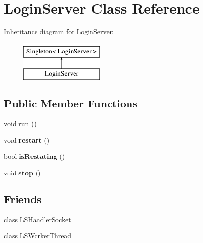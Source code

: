 \hypertarget{classLoginServer}{
\section{LoginServer Class Reference}
\label{classLoginServer}
}
Inheritance diagram for LoginServer:\begin{figure}[H]
\begin{center}
\leavevmode
\includegraphics[height=2.000000cm]{classLoginServer}
\end{center}
\end{figure}
\subsection*{Public Member Functions}
\begin{DoxyCompactItemize}
\item 
void \hyperlink{classLoginServer_a29e3fd0f5ebca8308d13c87e90587bf0}{run} ()
\item 
\hypertarget{classLoginServer_a7481a515c2e42aa94305651a77cc74f2}{
void {\bfseries restart} ()}
\label{classLoginServer_a7481a515c2e42aa94305651a77cc74f2}

\item 
\hypertarget{classLoginServer_ad3f8af7a2f8d63c41d7cc254052ce88d}{
bool {\bfseries isRestating} ()}
\label{classLoginServer_ad3f8af7a2f8d63c41d7cc254052ce88d}

\item 
\hypertarget{classLoginServer_a132ed40114e80995150ad7eb115d281a}{
void {\bfseries stop} ()}
\label{classLoginServer_a132ed40114e80995150ad7eb115d281a}

\end{DoxyCompactItemize}
\subsection*{Friends}
\begin{DoxyCompactItemize}
\item 
\hypertarget{classLoginServer_a99ea63cbe979da41ffe0caf6af91a790}{
class \hyperlink{classLoginServer_a99ea63cbe979da41ffe0caf6af91a790}{LSHandlerSocket}}
\label{classLoginServer_a99ea63cbe979da41ffe0caf6af91a790}

\item 
\hypertarget{classLoginServer_aef5acff34893c2cdf0dc9d1a35278a51}{
class \hyperlink{classLoginServer_aef5acff34893c2cdf0dc9d1a35278a51}{LSWorkerThread}}
\label{classLoginServer_aef5acff34893c2cdf0dc9d1a35278a51}

\end{DoxyCompactItemize}


